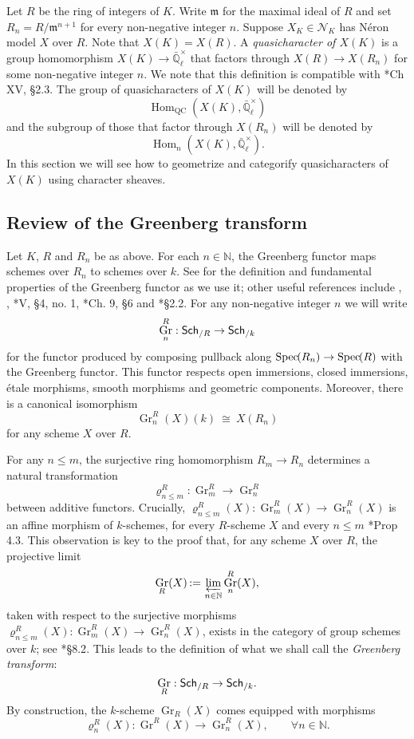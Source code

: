 \documentclass[10pt]{amsart}
\theoremstyle{plain}
\theoremstyle{definition}
\theoremstyle{remark}
\newcommand{\NN}{{\mathbb{N}}}
\newcommand{\EE}{\mathbb{\bar Q}_\ell}
\newcommand{\Fq}{k}
\newcommand{\EEx}{\EE^\times}
\newcommand{\m}{{\mathfrak{m}}}
\DeclareMathOperator{\Hom}{Hom}
\DeclareMathOperator{\Gr}{Gr}
\newcommand{\Spec}[1]{{\operatorname{Spec}\hskip-1pt( #1 )}}
\newcommand{\ceq}{{\, :=\, }}
\newcommand{\iso}{{\ \cong\ }}
\newcommand{\catname}[1]{\normalfont{\textsf{#1}}}
\newcommand{\Sch}[1]{{\catname{Sch}_{/#1}}}
\begin{document}
Let $R$ be the ring of integers of $K$.
Write $\m$ for the maximal ideal of $R$ and set $R_n = R/\m^{n+1}$ for every non-negative integer $n$.
Suppose $X_K \in \mathcal{N}_K$ has N\'eron model $X$ over $R$.
Note that $X(K) = X(R)$.
A \emph{quasicharacter of $X(K)$} is a group homomorphism $X(K) \to \EEx$ that factors through $X(R) \to X(R_n)$ for some non-negative integer $n$.
We note that this definition is compatible with \cite{cassels-frohlich:AlgebraicNumberTheory}*{Ch XV, \S 2.3}.
The group of quasicharacters of $X(K)$ will be denoted by 
\[
\Hom_\text{QC}(X(K),\EEx)
\]
 and the subgroup of those that factor through $X(R_n)$ will be denoted by 
 \[
 \Hom_n(X(K),\EEx).
\]
In this section we will see how to geometrize and categorify quasicharacters of $X(K)$ using character sheaves.

\subsection{Review of the Greenberg transform} \label{ssec:rev_Greenberg}

Let $K$, $R$ and $R_n$ be as above.
For each $n \in \NN$, the Greenberg functor maps schemes over $R_n$ to schemes over $\Fq$.
See \cite{bertrapelle-gonzales:Greenberg} for the definition and fundamental properties of the Greenberg functor as we use it; other useful references include
\cite{greenberg:61}, \cite{greenberg:63a},
\cite{demazure-gabriel:GroupesAlgebriques}*{V, \S 4, no. 1},
\cite{bosch-lutkebohmert-reynaud:NeronModels}*{Ch. 9, \S 6} and
\cite{nicaise-sebag:motivicSerre}*{\S 2.2}. %
%
For any non-negative integer $n$ we will write
\[
\Gr^R_n : \Sch{R} \to \Sch{\Fq}
\]
for the functor produced by composing pullback along $\Spec{R_n} \to \Spec{R}$ with the Greenberg functor. 
This functor respects open immersions, closed immersions, \'etale morphisms, smooth morphisms and geometric components.  Moreover, there is a canonical isomorphism
\[
\Gr^R_n(X)(\Fq) \iso X(R_n)
\]
for any scheme $X$ over $R$.

For any $n\leq m$,  the surjective ring homomorphism $R_{m} \to R_n$ determines a
natural transformation 
\[
\varrho^R_{n\leq m} : \Gr^R_{m} \to \Gr^R_n
\]
between additive functors.
Crucially, $\varrho^R_{n\leq m}(X): \Gr^R_{m}(X)\to \Gr^R_n(X)$ is an affine morphism of $\Fq$-schemes, for every $R$-scheme $X$ and every $n\leq m$ \cite{bertrapelle-gonzales:Greenberg}*{Prop 4.3}.
This observation is key to the proof that, for any scheme $X$ over $R$, the projective limit 
\[
\Gr_R(X) \ceq \varprojlim_{n\in \NN} \Gr^R_n(X),
\]
taken with respect to the surjective morphisms $\varrho^R_{n\leq m}(X) : \Gr^R_{m}(X) \to \Gr^R_n(X)$,
exists in the category of group schemes over $\Fq$;
see \cite{EGAIV3}*{\S 8.2}.
This leads to the definition of what we shall call the {\it Greenberg transform}:
\[
\Gr_R : \Sch{R} \to \Sch{\Fq}.
\]
By construction, the $\Fq$-scheme $\Gr_R(X)$ comes equipped with morphisms 
\[
\varrho^R_n(X) : \Gr^R(X) \to \Gr^R_n(X),\qquad \forall n\in \NN.
\]
\end{document}
